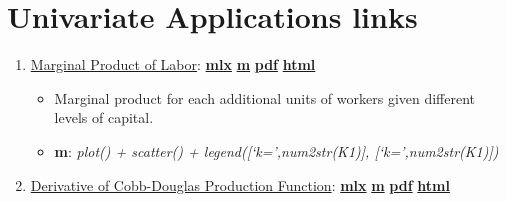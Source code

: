 \documentclass[
]{book}
\providecommand{\tightlist}{%
  \setlength{\itemsep}{0pt}\setlength{\parskip}{0pt}}
\begin{document}
\hypertarget{univariate-applications-links}{%
\section{Univariate Applications links}\label{univariate-applications-links}}

\begin{enumerate}
\def\labelenumi{\arabic{enumi}.}
\tightlist
\item
  \href{https://fanwangecon.github.io/Math4Econ/derivative_application/htmlpdfm/derivative_MPL_discrete_workers.html}{Marginal Product of Labor}: \href{https://github.com/FanWangEcon/Math4Econ/blob/master/derivative_application/derivative_MPL_discrete_workers.mlx}{\textbf{mlx}} \textbar{} \href{https://github.com/FanWangEcon/Math4Econ/blob/master/derivative_application/htmlpdfm/derivative_MPL_discrete_workers.m}{\textbf{m}} \textbar{} \href{https://github.com/FanWangEcon/Math4Econ/blob/master/derivative_application/htmlpdfm/derivative_MPL_discrete_workers.pdf}{\textbf{pdf}} \textbar{} \href{https://fanwangecon.github.io/Math4Econ/derivative_application/htmlpdfm/derivative_MPL_discrete_workers.html}{\textbf{html}}

  \begin{itemize}
  \tightlist
  \item
    Marginal product for each additional units of workers given different levels of capital.
  \item
    \textbf{m}: \emph{plot() + scatter() + legend({[}`k=',num2str(K1){]}, {[}`k=',num2str(K1){]})}
  \end{itemize}
\item
  \href{https://fanwangecon.github.io/Math4Econ/derivative_application/htmlpdfm/derivative_cobb_douglas.html}{Derivative of Cobb-Douglas Production Function}: \href{https://github.com/FanWangEcon/Math4Econ/blob/master/derivative_application/derivative_cobb_douglas.mlx}{\textbf{mlx}} \textbar{} \href{https://github.com/FanWangEcon/Math4Econ/blob/master/derivative_application/htmlpdfm/derivative_cobb_douglas.m}{\textbf{m}} \textbar{} \href{https://github.com/FanWangEcon/Math4Econ/blob/master/derivative_application/htmlpdfm/derivative_cobb_douglas.pdf}{\textbf{pdf}} \textbar{} \href{https://fanwangecon.github.io/Math4Econ/derivative_application/htmlpdfm/derivative_cobb_douglas.html}{\textbf{html}}


\end{enumerate}
\end{document}
